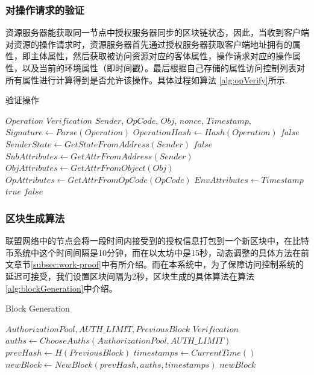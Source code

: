 \subsubsection{对操作请求的验证}

资源服务器能获取同一节点中授权服务器同步的区块链状态，因此，当收到客户端对资源的操作请求时，资源服务器首先通过授权服务器获取客户端地址拥有的属性，即主体属性，然后获取被访问资源对应的客体属性，操作请求对应的操作属性，以及当前的环境属性（即时间戳）。最后根据自己存储的属性访问控制列表对所有属性进行计算得到是否允许该操作。具体过程如算法 \ref{alg:opVerify}所示.

 \begin{algorithm}
 \caption{验证操作}
   \begin{algorithmic}[H]\label{alg:opVerify}
   \renewcommand{\algorithmicrequire}{\textbf{Input:}}
   \renewcommand{\algorithmicensure}{\textbf{Output:}}
   \REQUIRE $Operation$
   \ENSURE  $Verification$
    \STATE $Sender$, $OpCode$, $Obj$, $nonce$, $Timestamp$, $Signature \gets Parse(Operation)$
    \STATE $OperationHash \gets Hash(Operation)$
      \RETURN $false$
    \ENDIF
    \STATE $SenderState \gets GetStateFromAddress(Sender)$
      \RETURN $false$
    \ENDIF
    \STATE$SubAttributes \gets GetAttrFromAddress(Sender)$
    \STATE$ObjAttributes \gets GetAttrFromObject(Obj)$
    \STATE$OpAttributes \gets GetAttrFromOpCode(OpCode)$
    \STATE$EnvAttributes \gets Timestamp$
        \RETURN $true$
      \ENDIF
    \ENDFOR
   \RETURN $false$
   \end{algorithmic}
 \end{algorithm}

\subsubsection{区块生成算法}

联盟网络中的节点会将一段时间内接受到的授权信息打包到一个新区块中，在比特币系统中这个时间间隔是10分钟，而在以太坊中是15秒，动态调整的具体方法在前文章节\ref{subsec:work-proof}中有所介绍。而在本系统中，为了保障访问控制系统的延迟可接受，我们设置区块间隔为2秒，区块生成的具体算法在算法\ref{alg:blockGeneration}中介绍。

 \begin{algorithm}
 \caption{Block Generation}\label{alg:blockGeneration}
   \begin{algorithmic}[!htbp]
   \renewcommand{\algorithmicrequire}{\textbf{Input:}}
   \renewcommand{\algorithmicensure}{\textbf{Output:}}
   \REQUIRE $AuthorizationPool, AUTH\_LIMIT, PreviousBlock$
   \ENSURE  $Verification$
    \STATE $auths \gets ChooseAuths(AuthorizationPool, AUTH\_LIMIT)$
    \STATE $prevHash \gets H(PreviousBlock)$
    \STATE $timestamps \gets CurrentTime()$
    \STATE $newBlock \gets NewBlock(prevHash, auths, timestamps)$
   \RETURN $newBlock$
   \end{algorithmic}
 \end{algorithm}

